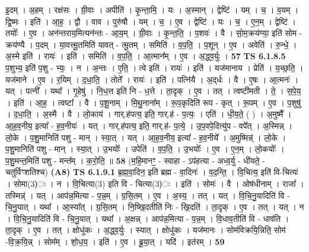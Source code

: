 \documentclass[17pt]{extarticle}
\begin{document}
                  इ॒दम् । अ॒हम् । रक्ष॑सः । ग्री॒वाः । अपीति॑ । कृ॒न्ता॒मि॒ । यः । अ॒स्मान् । द्वेष्टि॑ । यम् । च॒ । व॒यम् । द्वि॒ष्मः । इति॑ । आ॒ह॒ । द्वौ । वाव । पुरु॑षौ । यम् । च॒ । ए॒व । द्वेष्टि॑ । यः । च॒ । ए॒न॒म् । द्वेष्टि॑ । तयोः᳚ । ए॒व । अन॑न्तराय॒मित्यन॑न्तः - आ॒य॒म् । ग्री॒वाः । कृ॒न्त॒ति॒ । प॒शवः॑ । वै । सो॒म॒क्रय॑ण्या॒ इति॑ सोम - क्रय॑ण्यै । प॒दम् । या॒वत्त्मू॒तमिति॑ यावत् - त्मू॒तम् । समिति॑ । व॒प॒ति॒ । प॒शून् । ए॒व । अवेति॑ । रु॒न्धे॒ । अ॒स्मे इति॑ । रायः॑ । इति॑ । समिति॑ । व॒प॒ति॒ । आ॒त्मान᳚म् । ए॒व । अ॒द्ध्व॒र्युः । \textbf{  57} \newline
                  \newline
                                \textbf{ TS 6.1.8.5} \newline
                  प॒शुभ्य॒ इति॑ प॒शु - भ्यः॒ । न । अ॒न्तः । ए॒ति॒ । त्वे इति॑ । रायः॑ । इति॑ । यज॑मानाय । प्रेति॑ । य॒च्छ॒ति॒ । यज॑माने । ए॒व । र॒यिम् । द॒धा॒ति॒ । तोते᳚ । रायः॑ । इति॑ । पत्नि॑यै । अ॒द्‌र्धः । वै । ए॒षः । आ॒त्मनः॑ । यत् । पत्नी᳚ । यथा᳚ । गृ॒हेषु॑ । नि॒ध॒त्त इति॑ नि - ध॒त्ते । ता॒दृक् । ए॒व । तत् । त्वष्टी॑मती । ते॒ । स॒पे॒य॒ । इति॑ । आ॒ह॒ । त्वष्टा᳚ । वै । प॒शू॒नाम् । मि॒थु॒नाना᳚म् । रू॒प॒कृदिति॑ रूप - कृत् । रू॒पम् । ए॒व । प॒शुषु॑ । द॒धा॒ति॒ । अ॒स्मै । वै । लो॒काय॑ । गार्.ह॑पत्य॒ इति॒ गार्.ह॑ - प॒त्यः॒ । एति॑ । धी॒य॒ते॒ ( ) । अ॒मुष्मै᳚ । आ॒ह॒व॒नीय॒ इत्या᳚ - ह॒व॒नीयः॑ । यत् । गार्.ह॑पत्य॒ इति॒ गार्.ह॑- प॒त्ये॒ । उ॒प॒वपे॒दित्यु॑प - वपे᳚त् । अ॒स्मिन्न् । लो॒के । प॒शु॒मानिति॑ पशु - मान् । स्या॒त् । यत् । आ॒ह॒व॒नीय॒ इत्या᳚ - ह॒व॒नीये᳚ । अ॒मुष्मिन्न्॑ । लो॒के । प॒शु॒मानिति॑ पशु - मान् । स्या॒त् । उ॒भयोः᳚ । उपेति॑ । व॒प॒ति॒ । उ॒भयोः᳚ । ए॒व । ए॒न॒म् । लो॒कयोः᳚ । प॒शु॒मन्त॒मिति॑ पशु - मन्त᳚म् । क॒रो॒ति॒ ॥ \textbf{  58} \newline
                  \newline
                      (म॒हि॒मानꣳ॒॒ - स्वाहा - ऽप॑हत्या - अध्व॒र्यु - धी॑यते॒ - चतु॑र्विꣳशतिश्च)  \textbf{(A8)} \newline \newline
                                \textbf{ TS 6.1.9.1} \newline
                  ब्र॒ह्म॒वा॒दिन॒ इति॑ ब्रह्म - वा॒दिनः॑ । व॒द॒न्ति॒ । वि॒चित्य॒ इति॑ वि-चित्यः॑ । सोमा(3)ः । न । वि॒चित्या(3) इति वि - चित्या(3)ः । इति॑ । सोमः॑ । वै । ओष॑धीनाम् । राजा᳚ । तस्मिन्न्॑ । यत् । आप॑न्न॒मित्या - प॒न्न॒म् । ग्र॒सि॒तम् । ए॒व । अ॒स्य॒ । तत् । यत् । वि॒चि॒नु॒यादिति॑ वि - चि॒नु॒यात् । यथा᳚ । आ॒स्या᳚त् । ग्र॒सि॒तम् । नि॒ष्खि॒दतीति॑ निः -   खि॒दति॑ । ता॒दृक् । ए॒व । तत् । यत् । न । वि॒चि॒नु॒यादिति॑ वि - चि॒नु॒यात् । यथा᳚ । अ॒क्षन्न् । आप॑न्न॒मित्या - प॒न्न॒म् । वि॒धाव॒तीति॑ वि - धाव॑ति । ता॒दृक् । ए॒व । तत् । क्षोधु॑कः । अ॒द्ध्व॒र्युः । स्यात् । क्षोधु॑कः । यज॑मानः । सोम॑विक्रयि॒न्निति॒ सोम॑ -वि॒क्र॒यि॒न्न् । सोम᳚म् । शो॒ध॒य॒ । इति॑ । ए॒व । ब्रू॒या॒त् । यदि॑ । इत॑रम् । \textbf{  59} \newline
\end{document}
